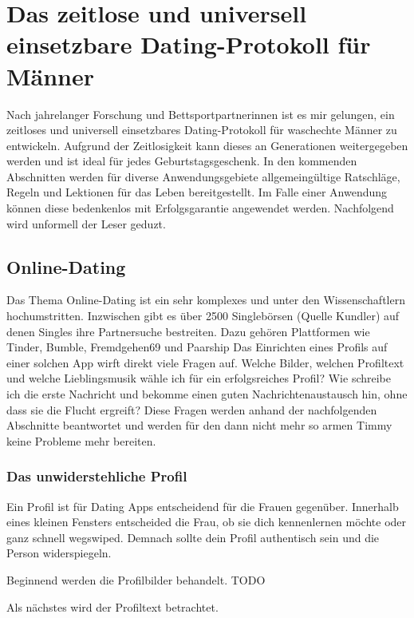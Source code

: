 \chapter{Das zeitlose und universell einsetzbare Dating-Protokoll für Männer}
\label{chapter-protokoll}

Nach jahrelanger Forschung und Bettsportpartnerinnen ist es mir gelungen, ein zeitloses und universell einsetzbares Dating-Protokoll für waschechte Männer zu entwickeln.
Aufgrund der Zeitlosigkeit kann dieses an Generationen weitergegeben werden und ist ideal für jedes Geburtstagsgeschenk.
In den kommenden Abschnitten werden für diverse Anwendungsgebiete allgemeingültige Ratschläge, Regeln und Lektionen für das Leben bereitgestellt. 
Im Falle einer Anwendung können diese bedenkenlos mit Erfolgsgarantie angewendet werden.
Nachfolgend wird unformell der Leser geduzt.


\section{Online-Dating}

Das Thema Online-Dating ist ein sehr komplexes und unter den Wissenschaftlern hochumstritten.
Inzwischen gibt es über 2500 Singlebörsen (Quelle Kundler) auf denen Singles ihre Partnersuche bestreiten.
Dazu gehören Plattformen wie Tinder, Bumble, Fremdgehen69 und Paarship 
Das Einrichten eines Profils auf einer solchen App wirft direkt viele Fragen auf. 
Welche Bilder, welchen Profiltext und welche Lieblingsmusik wähle ich für ein erfolgsreiches Profil?
Wie schreibe ich die erste Nachricht und bekomme einen guten Nachrichtenaustausch hin, ohne dass sie die Flucht ergreift?
Diese Fragen werden anhand der nachfolgenden Abschnitte beantwortet und werden für den dann nicht mehr so armen Timmy keine Probleme mehr bereiten.


\subsection{Das unwiderstehliche Profil}

Ein Profil ist für Dating Apps entscheidend für die Frauen gegenüber.
Innerhalb eines kleinen Fensters entscheided die Frau, ob sie dich kennenlernen möchte oder ganz schnell wegswiped.
Demnach sollte dein Profil authentisch sein und die Person widerspiegeln.

Beginnend werden die Profilbilder behandelt.
TODO

Als nächstes wird der Profiltext betrachtet. 


